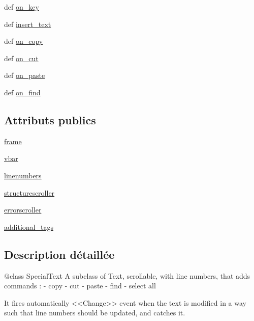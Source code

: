 \begin{DoxyCompactItemize}
\item 
def \hyperlink{classtex__editor_1_1utils_1_1_special_text_a6eeb46052643bc78189fde776c810816}{on\+\_\+key}
\item 
def \hyperlink{classtex__editor_1_1utils_1_1_special_text_a7b1081969baa7ac4a02f5ee923ef7186}{insert\+\_\+text}
\item 
def \hyperlink{classtex__editor_1_1utils_1_1_special_text_afc888f5c0bf9de7be4f144718b3fe8fd}{on\+\_\+copy}
\item 
def \hyperlink{classtex__editor_1_1utils_1_1_special_text_a1403cd4dac3022124fa5fbe2c661eacd}{on\+\_\+cut}
\item 
def \hyperlink{classtex__editor_1_1utils_1_1_special_text_ad6631a1cf04694d144470bbe3e109e98}{on\+\_\+paste}
\item 
def \hyperlink{classtex__editor_1_1utils_1_1_special_text_a6b1b1d52a74cf99fc4d49c1737fec8e0}{on\+\_\+find}
\end{DoxyCompactItemize}
\subsection*{Attributs publics}
\begin{DoxyCompactItemize}
\item 
\hyperlink{classtex__editor_1_1utils_1_1_special_text_a92e99a123af2b93e7b7bb69585240f13}{frame}
\item 
\hyperlink{classtex__editor_1_1utils_1_1_special_text_aa01037a9c0d49d806abbc9822c60cc35}{vbar}
\item 
\hyperlink{classtex__editor_1_1utils_1_1_special_text_ab0eb81132ed588c16c3561a8b726619f}{linenumbers}
\item 
\hyperlink{classtex__editor_1_1utils_1_1_special_text_aa8d9c577e09d0f6ad96671552ce38a64}{structurescroller}
\item 
\hyperlink{classtex__editor_1_1utils_1_1_special_text_a7cbbcc511806669887afff4e53bc7d1a}{errorscroller}
\item 
\hyperlink{classtex__editor_1_1utils_1_1_special_text_a6a3b266f1363705b2b96e2430a60621d}{additional\+\_\+tags}
\end{DoxyCompactItemize}


\subsection{Description détaillée}
\begin{DoxyVerb}@class SpecialText
A subclass of Text, scrollable, with line numbers, that adds commands :
- copy
- cut
- paste
- find
- select all

It fires automatically <<Change>> event when the text is modified in a way
such that line numbers should be updated, and catches it.
\end{DoxyVerb}
 

